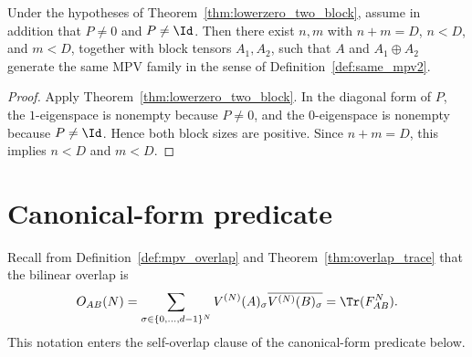 \begin{theorem}
    \label{thm:lowerzero_two_block_strict}
    \leanok
    Under the hypotheses of Theorem~\ref{thm:lowerzero_two_block},
    assume in addition that $P \neq 0$ and $P \neq \Id$.
    Then there exist $n,m$ with $n + m = D$, $n < D$, and $m < D$, together
    with block tensors $A_1, A_2$, such that
    $A$ and $A_1 \oplus A_2$ generate the same MPV family in the sense of
    Definition~\ref{def:same_mpv2}.
\end{theorem}

\begin{proof}
    \leanok
    Apply Theorem~\ref{thm:lowerzero_two_block}.
    In the diagonal form of $P$, the $1$-eigenspace is nonempty because
    $P \neq 0$, and the $0$-eigenspace is nonempty because $P \neq \Id$.
    Hence both block sizes are positive.
    Since $n + m = D$, this implies $n < D$ and $m < D$.
\end{proof}

\section{Canonical-form predicate}

Recall from Definition~\ref{def:mpv_overlap}
and Theorem~\ref{thm:overlap_trace} that the bilinear overlap is
\[
    O_{AB}(N) = \sum_{\sigma \in \{0,\ldots,d{-}1\}^N}
    V^{(N)}(A)_\sigma \overline{V^{(N)}(B)_\sigma} = \Tr(F_{AB}^N).
\]
This notation enters the self-overlap clause of the canonical-form predicate
below.

